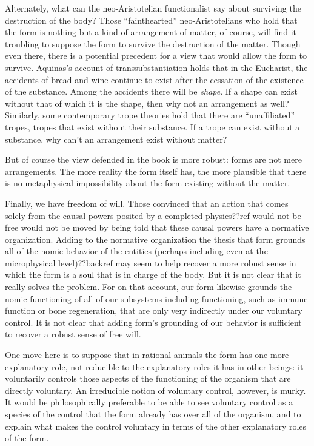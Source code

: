 Alternately, what can the neo-Aristotelian functionalist say about surviving the destruction of the body? Those ``fainthearted'' 
neo-Aristotelians who hold that the form is nothing but a kind of arrangement of matter, of course, will find it troubling to
suppose the form to survive the destruction of the matter. Though even there, there is a potential precedent for a view
that would allow the form to survive. Aquinas's account of transsubstantiation holds that in the Eucharist, the accidents of
bread and wine continue to exist after the cessation of the existence of the substance. Among the accidents there will be 
\textit{shape}. If a shape can exist without that of which it is the shape, then why not an arrangement as well? Similarly,
some contemporary trope theories hold that there are ``unaffiliated'' tropes, tropes that exist without their substance. If a 
trope can exist without a substance, why can't an arrangement exist without matter? 

But of course the view defended in the book is more robust: forms are not mere arrangements. The more reality the form itself
has, the more plausible that there is no metaphysical impossibility about the form existing without the matter. 

Finally, we have freedom of will. Those convinced that an action that comes solely from the causal powers posited by a completed
physics??ref would not be free would not be moved by being told that these causal powers have a normative organization. 
Adding to the normative organization the thesis that form grounds all of the nomic behavior of the entities (perhaps including 
even at the microphysical level)??backref may seem to help recover a more robust sense in which the form is a soul that is in 
charge of the body. But it is not clear that it really solves the problem. For on that account, our form likewise grounds 
the nomic functioning of all of our subsystems including functioning, such as immune function or bone regeneration, that are 
only very indirectly under our voluntary control. It is not clear that adding form's grounding of our behavior is 
sufficient to recover a robust sense of free will.

One move here is to suppose that in rational animals the form has one more explanatory role, not reducible to the explanatory
roles it has in other beings: it voluntarily controls those aspects of the functioning of the organism that are directly
voluntary. An irreducible notion of voluntary control, however, is murky. It would be philosophically preferable to be able to see 
voluntary control as a species of the control that the form already has over all of the organism, and to explain what makes the 
control voluntary in terms of the other explanatory roles of the form. 

